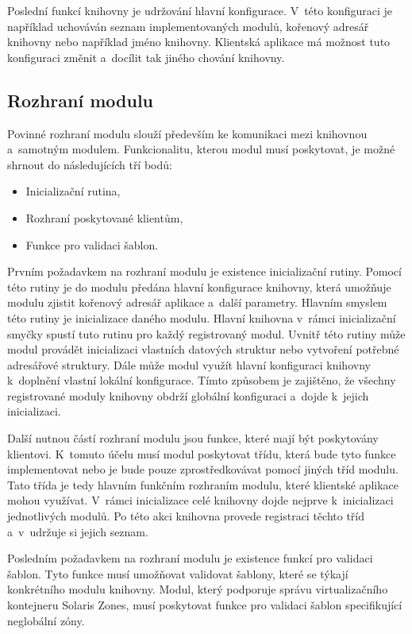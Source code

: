 Poslední funkcí knihovny je udržování hlavní konfigurace. V~této konfiguraci je například uchováván seznam implementovaných
modulů, kořenový adresář knihovny nebo například jméno knihovny. Klientská aplikace má možnost tuto konfiguraci změnit
a~docílit tak jiného chování knihovny.
\subsection{Rozhraní modulu}
\label{chapter:implementation:library:interface}
Povinné rozhraní modulu slouží především ke komunikaci mezi knihovnou a~samotným modulem. Funkcionalitu, kterou modul
musí poskytovat, je možné shrnout do následujících tří bodů:
\begin{itemize}
 \item Inicializační rutina,
 \item Rozhraní poskytované klientům,
 \item Funkce pro validaci šablon.
\end{itemize}
Prvním požadavkem na rozhraní modulu je existence inicializační rutiny. Pomocí této rutiny je do modulu předána hlavní
konfigurace knihovny, která umožňuje modulu zjistit kořenový adresář aplikace a~další parametry. Hlavním smyslem
této rutiny je inicializace daného modulu. Hlavní knihovna v~rámci inicializační smyčky spustí tuto rutinu pro každý
registrovaný modul. Uvnitř této rutiny může modul provádět inicializaci vlastních datových struktur nebo vytvoření potřebné
adresářové struktury. Dále může modul využít hlavní konfiguraci knihovny k~doplnění vlastní lokální konfigurace. Tímto způsobem
je zajištěno, že všechny registrované moduly knihovny obdrží globální konfiguraci a~dojde k~jejich inicializaci.

Další nutnou částí rozhraní modulu jsou funkce, které mají být poskytovány klientovi. K~tomuto účelu musí modul poskytovat
třídu, která bude tyto funkce implementovat nebo je bude pouze zprostředkovávat pomocí jiných tříd modulu. Tato třída je tedy
hlavním funkčním rozhraním modulu, které klientské aplikace mohou využívat. V~rámci inicializace celé knihovny dojde nejprve
k~inicializaci jednotlivých modulů. Po této akci knihovna provede registraci těchto tříd a~v~udržuje si jejich seznam.

Posledním požadavkem na rozhraní modulu je existence funkcí pro validaci šablon. Tyto funkce musí umožňovat validovat šablony,
které se týkají konkrétního modulu knihovny. Modul, který podporuje správu virtualizačního kontejneru Solaris Zones, musí poskytovat
funkce pro validaci šablon specifikující neglobální zóny.

